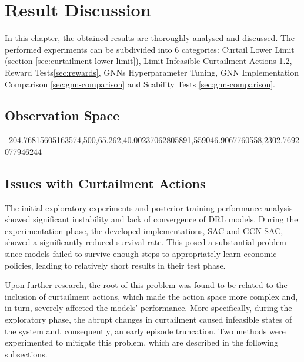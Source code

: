 \chapter{Result Discussion}

In this chapter, the obtained results are thoroughly analysed and discussed. The performed experiments can be subdivided into 6 categories: Curtail Lower Limit (section \ref{sec:curtailment-lower-limit}), Limit Infeasible Curtailment Actions \ref{sec:limit-infeasible}, Reward Tests\ref{sec:rewards}, \acp{GNN} Hyperparameter Tuning, \ac{GNN} Implementation Comparison \ref{sec:gnn-comparison} and Scability Tests \ref{sec:gnn-comparison}.

\section{Observation Space}

\
204.76815605163574,500,65.262,40.00237062805891,559046.9067760558,2302.7692077946244

\section{Issues with Curtailment Actions} \label{sec:limit-infeasible}

The initial exploratory experiments and posterior training performance analysis showed significant instability and lack of convergence of \ac{DRL} models. During the experimentation phase, the developed implementations, SAC and GCN-SAC, showed a significantly reduced survival rate. This posed a substantial problem since models failed to survive enough steps to appropriately learn economic policies, leading to relatively short results in their test phase. \par
Upon further research, the root of this problem was found to be related to the inclusion of curtailment actions, which made the action space more complex and, in turn, severely affected the models' performance. More specifically, during the exploratory phase, the abrupt changes in curtailment caused infeasible states of the system and, consequently, an early episode truncation.
Two methods were experimented to mitigate this problem, which are described in the following subsections.


